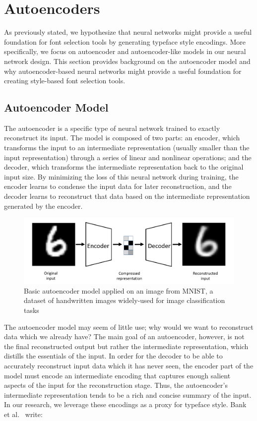 \section{Autoencoders}

As previously stated, we hypothesize that neural networks might provide a useful foundation for font selection tools by generating typeface style encodings. More specifically, we focus on autoencoder and autoencoder-like models in our neural network design. This section provides background on the autoencoder model and why autoencoder-based neural networks might provide a useful foundation for creating style-based font selection tools.

\subsection{Autoencoder Model}

The autoencoder \cite{rumelhart1986} is a specific type of neural network trained to exactly reconstruct its input. The model is composed of two parts: an encoder, which transforms the input to an intermediate representation (usually smaller than the input representation) through a series of linear and nonlinear operations; and the decoder, which transforms the intermediate representation back to the original input size. By minimizing the loss of this neural network during training, the encoder learns to condense the input data for later reconstruction, and the decoder learns to reconstruct that data based on the intermediate representation generated by the encoder.

\begin{figure}[h]
    \centering
    \includegraphics[width=\textwidth]{images/autoencoder-model.png}
    \caption{Basic autoencoder model applied on an image from MNIST, a dataset of handwritten images widely-used for image classification tasks \cite{lecun1998}}
    \label{fig:autoencoder-model}
\end{figure}

The autoencoder model may seem of little use; why would we want to reconstruct data which we already have? The main goal of an autoencoder, however, is not the final reconstructed output but rather the intermediate representation, which distills the essentials of the input. In order for the decoder to be able to accurately reconstruct input data which it has never seen, the encoder part of the model must encode an intermediate encoding that captures enough salient aspects of the input for the reconstruction stage. Thus, the autoencoder's intermediate representation tends to be a rich and concise summary of the input. In our research, we leverage these encodings as a proxy for typeface style. Bank et al.\ \cite{bank2021autoencoders} write:

